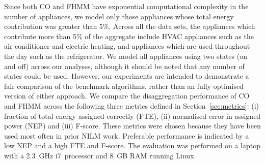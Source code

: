 \documentclass{sig-alternate}
\newcommand{\redcolor}[1]{\textcolor{red}{#1}}
\newcommand{\secref}[1]{Section~\ref{#1}}
\newcommand{\tabref}[1]{Table~\ref{#1}}
\begin{document}
Since both CO and FHMM have exponential computational complexity in the number of appliances, we model only those appliances whose total energy contribution was greater than 5\%. Across all the data sets, the appliances which contribute more than 5\% of the aggregate include HVAC appliances such as the air conditioner and electric heating, and appliances which are used throughout the day such as the refrigerator. We model all appliances using two states (on and off) across our analyses, although it should be noted that any number of states could be used. However, our experiments are intended to demonstrate a fair comparison of the benchmark algorithms, rather than an fully optimised version of either approach.
We compare the disaggregation performance of CO and FHMM across the following three metrics defined in \secref{sec:metrics}: (i) fraction of total energy assigned correctly (FTE), (ii) normalised error in assigned power (NEP) and (iii) F-score. These metrics were chosen because they have been used most often in prior NILM work. Preferable performance is indicated by a low NEP and a high FTE and F-score. The evaluation was performed on a laptop with a 2.3~GHz i7~processor and 8~GB RAM running Linux.

\end{document}
